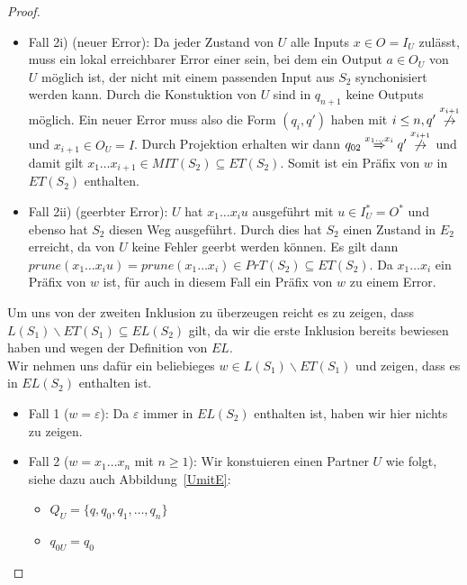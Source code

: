 \begin{proof}
\begin{itemize}
\begin{itemize}
        \item Fall 2i) (neuer Error): Da jeder Zustand von $U$ alle Inputs $x\in
          O=I_U$ zulässt, muss ein lokal erreichbarer Error einer sein, bei dem
          ein Output $a\in O_U$ von $U$ möglich ist, der nicht mit einem
          passenden Input aus $S_2$ synchonisiert werden kann. Durch die
          Konstuktion von $U$ sind in $q_{n+1}$ keine Outputs möglich. Ein
          neuer Error muss also die Form $(q_i,q')$ haben mit $i\leq n, q'
          \overset{x_{i+1}}{\not{\hspace{-0.1cm}\rightarrow}}$ und $x_{i+1}\in
          O_U=I$. Durch Projektion erhalten wir dann $q_{02} \overset{x_1\dots
          x_i}{\Rightarrow} q'
          \overset{x_{i+1}}{\not{\hspace{-0.1cm}\rightarrow}}$ und damit gilt
          $x_1\dots x_{i+1}\in MIT(S_2)\subseteq ET(S_2)$. Somit ist ein Präfix
          von $w$ in $ET(S_2)$ enthalten.
        \item Fall 2ii) (geerbter Error): $U$ hat $x_1\dots x_i u$ ausgeführt
          mit $u\in I_U^*=O^*$ und ebenso hat $S_2$ diesen Weg ausgeführt.
          Durch dies hat $S_2$ einen Zustand in $E_2$ erreicht, da von $U$
          keine Fehler geerbt werden können. Es gilt dann $prune(x_1\dots
          x_iu)=prune(x_1\dots x_i)\in PrT(S_2)\subseteq ET(S_2)$. Da $x_1\dots
          x_i$ ein Präfix von $w$ ist, für auch in diesem Fall ein Präfix von
          $w$ zu einem Error.
      \end{itemize}
  \end{itemize}
  Um uns von der zweiten Inklusion zu überzeugen reicht es zu zeigen, dass
  $L(S_1)\backslash ET(S_1)\subseteq EL(S_2)$ gilt, da wir die erste Inklusion
  bereits bewiesen haben und wegen der Definition von $EL$.\\
  Wir nehmen uns dafür ein beliebieges $w\in L(S_1)\backslash ET(S_1)$ und
  zeigen, dass es in $EL(S_2)$ enthalten ist.
  \begin{itemize}
    \item Fall 1 ($w=\varepsilon$): Da $\varepsilon$ immer in $EL(S_2)$
      enthalten ist, haben wir hier nichts zu zeigen.
    \item Fall 2 ($w=x_1\dots x_n$ mit $n\geq 1$): Wir konstuieren einen
      Partner $U$ wie folgt, siehe dazu auch Abbildung~\ref{UmitE}:
      \begin{itemize}
        \item $Q_U=\{q,q_0,q_1,\dots ,q_n\}$
        \item $q_{0U}=q_0$

\end{itemize}
\end{itemize}
\end{proof}
